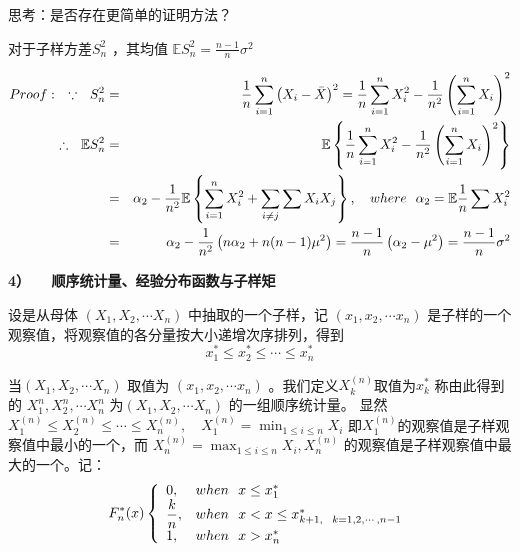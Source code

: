 		思考：是否存在更简单的证明方法？
		
	\begin{theorem}
		对于子样方差$ S_{n}^{2} $ ，其均值 $ \mathbb{E} S_{n}^{2}=\frac{n-1}{n} \sigma^{2} $
	\end{theorem}
		\begin{eqnarray}
			Proof: \quad \because  \ \  S_{n}^{2} & = & \frac{1}{n} \sum_{i  =  1}^{n}\left(X_{i}-\bar{X}\right)^{2}  
			=  \frac{1}{n} \sum_{i  = 1}^{n} X_{i}^{2}-\frac{1}{n^{2}}\left(\sum_{i  =  1}^{n} X_{i}\right)^{2}
			\notag \\
			\therefore  \ \  \mathbb{E} S_{n}^{2} & = & \mathbb{E}\left\{\frac{1}{n} \sum_{i=1}^{n} X_{i}^{2}-\frac{1}{n^{2}}\left(\sum_{i=1}^{n} X_{i}\right)^{2}\right\}
			\notag \\ 
			& = & \alpha_{2}-\frac{1}{n^{2}} \mathbb{E}\left\{\sum_{i=1}^{n} X_{i}^{2}+\sum_{i \neq j} \sum X_{i} X_{j}\right\}
			,\quad where \ \  \alpha_{2} = \mathbb{E} \frac{1}{n} \sum X_{i}^{2} \notag \\
			& = & \alpha_{2}-\frac{1}{n^{2}}\left(n \alpha_{2}+n(n-1) \mu^{2}\right) 
			=\frac{n-1}{n}\left(\alpha_{2}-\mu^{2}\right)=\frac{n-1}{n} \sigma^{2} \notag
		\end{eqnarray}
		
{\bf 4） \ \ 顺序统计量、经验分布函数与子样矩}
		
		设是从母体 $  (X_{1}, X_{2}, \cdots X_{n})  $  中抽取的一个子样，记 $  (x_{1}, x_{2}, \cdots x_{n})  $  是子样的一个观察值，将观察值的各分量按大小递增次序排列，得到		
			$$ x_{1}^{*} \leqslant x_{2}^{*} \leqslant \cdots \leqslant x_{n}^{*} $$
			
        当$  (X_{1}, X_{2}, \cdots X_{n})  $ 取值为 $  (x_{1}, x_{2}, \cdots x_{n})  $ 。我们定义$ X_{k}^{(n)} $取值为$ x_{k}^{*} $ 称由此得到的  $ X_{1}^{n}, X_{2}^{n}, \cdots X_{n}^{n}   $  为$  (X_{1}, X_{2}, \cdots X_{n})  $ 的一组顺序统计量。 显然 
        $ X_{1}^{(n)} \leqslant X_{2}^{(n)} \leqslant \cdots \leqslant X_{n}^{(n)}, \quad X_{1}^{(n)}= \displaystyle \min _{1 \leq i \leq n} X_{i} $
		即$ X_{1}^{(n)} $的观察值是子样观察值中最小的一个，而
		$  X_{n}^{(n)} = \displaystyle \max _{1 \leq i \leq n} X_{i}, X_{n}^{(n)} $ 的观察值是子样观察值中最大的一个。记：
		\begin{eqnarray}
			F_{n}^{*}(x)    
			\left\{\begin{array}{ll}
				0,               & when   \ \   x \leq x_{1}^{*} \notag  \\
				\dfrac{k}{n},    & when   \ \   x<x \leq x_{k+1,  \ \ k  =  1,2, \cdots, n-1}^{*} \notag \\
				1,               & when   \ \   x>x_{n}^{*} \notag
			\end{array}\right.
		\end{eqnarray}
		
